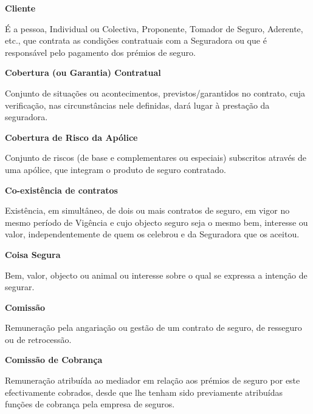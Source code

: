 \begin{description}
\item \textbf{Cliente}

É a pessoa, Individual ou Colectiva, Proponente, Tomador de Seguro, Aderente, etc., que contrata as condições contratuais com a Seguradora ou que é responsável pelo pagamento dos prémios de seguro.
\end{description}

\begin{description}
\item \textbf{Cobertura (ou Garantia) Contratual}

Conjunto de situações ou acontecimentos, previstos/garantidos no contrato, cuja verificação, nas circunstâncias nele definidas, dará lugar à prestação da seguradora.
\end{description}

\begin{description}
\item \textbf{Cobertura de Risco da Apólice}

Conjunto de riscos (de base e complementares ou especiais) subscritos através de uma apólice, que integram o produto de seguro contratado.
\end{description}

\begin{description}
\item \textbf{Co-existência de contratos}

Existência, em simultâneo, de dois ou mais contratos de seguro, em vigor no mesmo período de Vigência e cujo objecto seguro seja o mesmo bem, interesse ou valor, independentemente de quem os celebrou e da Seguradora que os aceitou.
\end{description}

\begin{description}
\item \textbf{Coisa Segura}

Bem, valor, objecto ou animal ou interesse sobre o qual se expressa a intenção de segurar.\end{description}

\begin{description}
\item \textbf{Comissão}

Remuneração pela angariação ou gestão de um contrato de seguro, de resseguro ou de retrocessão.\end{description}

\begin{description}
\item \textbf{Comissão de Cobrança}

Remuneração atribuída ao mediador em relação aos prémios de seguro por este efectivamente cobrados, desde que lhe tenham sido previamente atribuídas funções de cobrança pela empresa de seguros.
\end{description}

